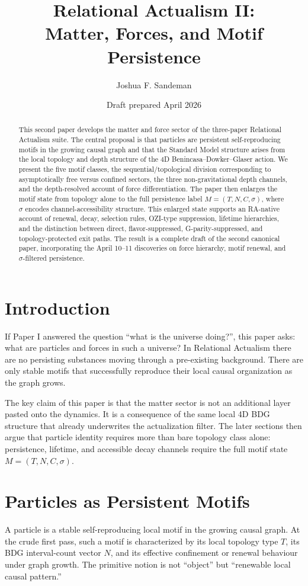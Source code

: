 \documentclass[11pt]{article}
\title{Relational Actualism II:\\Matter, Forces, and Motif Persistence}
\author{Joshua F. Sandeman}
\date{Draft prepared April 2026}
\begin{document}
\maketitle

\begin{abstract}
This second paper develops the matter and force sector of the three-paper Relational Actualism suite. The central proposal is that particles are persistent self-reproducing motifs in the growing causal graph and that the Standard Model structure arises from the local topology and depth structure of the 4D Benincasa--Dowker--Glaser action. We present the five motif classes, the sequential/topological division corresponding to asymptotically free versus confined sectors, the three non-gravitational depth channels, and the depth-resolved account of force differentiation. The paper then enlarges the motif state from topology alone to the full persistence label $M=(T,N,C,\sigma)$, where $\sigma$ encodes channel-accessibility structure. This enlarged state supports an RA-native account of renewal, decay, selection rules, OZI-type suppression, lifetime hierarchies, and the distinction between direct, flavor-suppressed, G-parity-suppressed, and topology-protected exit paths. The result is a complete draft of the second canonical paper, incorporating the April 10--11 discoveries on force hierarchy, motif renewal, and $\sigma$-filtered persistence.
\end{abstract}

\section{Introduction}
If Paper I answered the question ``what is the universe doing?'', this paper asks: what are particles and forces in such a universe? In Relational Actualism there are no persisting substances moving through a pre-existing background. There are only stable motifs that successfully reproduce their local causal organization as the graph grows.

The key claim of this paper is that the matter sector is not an additional layer pasted onto the dynamics. It is a consequence of the same local 4D BDG structure that already underwrites the actualization filter. The later sections then argue that particle identity requires more than bare topology class alone: persistence, lifetime, and accessible decay channels require the full motif state $M=(T,N,C,\sigma)$.

\section{Particles as Persistent Motifs}
A particle is a stable self-reproducing local motif in the growing causal graph. At the crude first pass, such a motif is characterized by its local topology type $T$, its BDG interval-count vector $N$, and its effective confinement or renewal behaviour under graph growth. The primitive notion is not ``object'' but ``renewable local causal pattern.''
\end{document}
